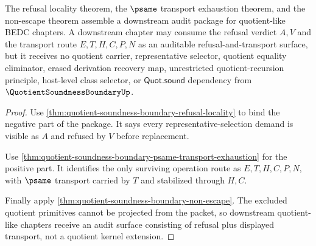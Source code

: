 \begin{theorem}
\label{thm:quotient-soundness-boundary-downstream-audit-package}
The refusal locality theorem, the $\psame$ transport exhaustion theorem, and the non-escape theorem assemble a downstream audit package for quotient-like BEDC chapters. A downstream chapter may consume the refusal verdict $A,V$ and the transport route $E,T,H,C,P,N$ as an auditable refusal-and-transport surface, but it receives no quotient carrier, representative selector, quotient equality eliminator, erased derivation recovery map, unrestricted quotient-recursion principle, host-level class selector, or $\mathsf{Quot.sound}$ dependency from $\QuotientSoundnessBoundaryUp$.
\end{theorem}
\begin{proof}
Use \autoref{thm:quotient-soundness-boundary-refusal-locality} to bind the negative part of the package. It says every representative-selection demand is visible as $A$ and refused by $V$ before replacement.

Use \autoref{thm:quotient-soundness-boundary-psame-transport-exhaustion} for the positive part. It identifies the only surviving operation route as $E,T,H,C,P,N$, with $\psame$ transport carried by $T$ and stabilized through $H,C$.

Finally apply \autoref{thm:quotient-soundness-boundary-non-escape}. The excluded quotient primitives cannot be projected from the packet, so downstream quotient-like chapters receive an audit surface consisting of refusal plus displayed transport, not a quotient kernel extension.
\end{proof}

